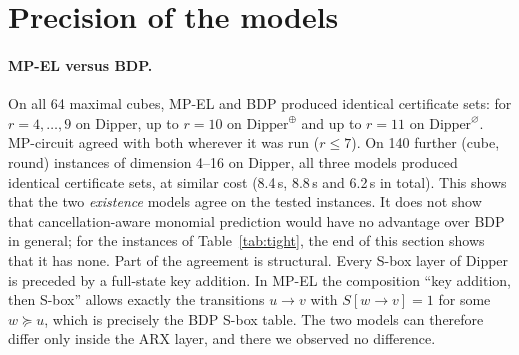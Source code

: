 \documentclass[11pt,a4paper]{article}
\theoremstyle{definition}
\theoremstyle{remark}
\newcommand{\MPEL}{\textsf{MP-EL}}
\newcommand{\MPC}{\textsf{MP-circuit}}
\newcommand{\BDP}{\textsf{BDP}}
\begin{document}
\section{Precision of the models}\label{sec:tightness}

\paragraph{\MPEL{} versus \BDP.} On all 64 maximal cubes, \MPEL{} and \BDP{} produced identical certificate sets: for $r=4,\dots,9$ on Dipper, up to $r=10$ on $\mathrm{Dipper}^{\oplus}$ and up to $r=11$ on $\mathrm{Dipper}^{\varnothing}$. \MPC{} agreed with both wherever it was run ($r\le7$). On 140 further (cube, round) instances of dimension 4--16 on Dipper, all three models produced identical certificate sets, at similar cost (8.4\,s, 8.8\,s and 6.2\,s in total). This shows that the two \emph{existence} models agree on the tested instances. It does not show that cancellation-aware monomial prediction would have no advantage over \BDP{} in general; for the instances of Table~\ref{tab:tight}, the end of this section shows that it has none. Part of the agreement is structural. Every S-box layer of Dipper is preceded by a full-state key addition. In \MPEL{} the composition ``key addition, then S-box'' allows exactly the transitions $u\to v$ with $S[w\to v]=1$ for some $w\succeq u$, which is precisely the BDP S-box table. The two models can therefore differ only inside the ARX layer, and there we observed no difference.
\end{document}
